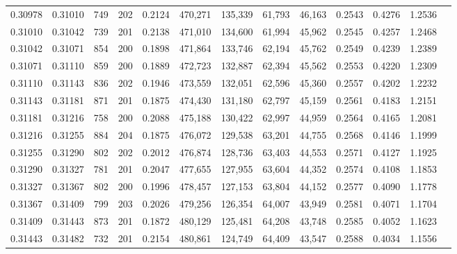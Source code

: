 \begin{tabular}{rrrrrrrrrrrrr}
0.30978 & 0.31010 &   749 & 202 &                                     0.2124 & 470,271 & 135,339 &  61,793 &  46,163 & 0.2543 & 0.4276 & 1.2536 \\
0.31010 & 0.31042 &   739 & 201 &                                     0.2138 & 471,010 & 134,600 &  61,994 &  45,962 & 0.2545 & 0.4257 & 1.2468 \\
0.31042 & 0.31071 &   854 & 200 &                                     0.1898 & 471,864 & 133,746 &  62,194 &  45,762 & 0.2549 & 0.4239 & 1.2389 \\
0.31071 & 0.31110 &   859 & 200 &                                     0.1889 & 472,723 & 132,887 &  62,394 &  45,562 & 0.2553 & 0.4220 & 1.2309 \\
0.31110 & 0.31143 &   836 & 202 &                                     0.1946 & 473,559 & 132,051 &  62,596 &  45,360 & 0.2557 & 0.4202 & 1.2232 \\
0.31143 & 0.31181 &   871 & 201 &                                     0.1875 & 474,430 & 131,180 &  62,797 &  45,159 & 0.2561 & 0.4183 & 1.2151 \\
0.31181 & 0.31216 &   758 & 200 &                                     0.2088 & 475,188 & 130,422 &  62,997 &  44,959 & 0.2564 & 0.4165 & 1.2081 \\
0.31216 & 0.31255 &   884 & 204 &                                     0.1875 & 476,072 & 129,538 &  63,201 &  44,755 & 0.2568 & 0.4146 & 1.1999 \\
0.31255 & 0.31290 &   802 & 202 &                                     0.2012 & 476,874 & 128,736 &  63,403 &  44,553 & 0.2571 & 0.4127 & 1.1925 \\
0.31290 & 0.31327 &   781 & 201 &                                     0.2047 & 477,655 & 127,955 &  63,604 &  44,352 & 0.2574 & 0.4108 & 1.1853 \\
0.31327 & 0.31367 &   802 & 200 &                                     0.1996 & 478,457 & 127,153 &  63,804 &  44,152 & 0.2577 & 0.4090 & 1.1778 \\
0.31367 & 0.31409 &   799 & 203 &                                     0.2026 & 479,256 & 126,354 &  64,007 &  43,949 & 0.2581 & 0.4071 & 1.1704 \\
0.31409 & 0.31443 &   873 & 201 &                                     0.1872 & 480,129 & 125,481 &  64,208 &  43,748 & 0.2585 & 0.4052 & 1.1623 \\
0.31443 & 0.31482 &   732 & 201 &                                     0.2154 & 480,861 & 124,749 &  64,409 &  43,547 & 0.2588 & 0.4034 & 1.1556 \\

\end{tabular}
